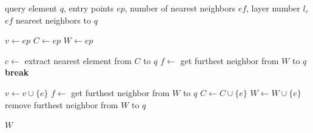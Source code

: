 \begin{algorithm}[H]
    \caption{SEARCH-LAYER \cite{Malkov-Yashunin-2016}}
    \label{alg:hnsw-2}
    \begin{algorithmic}[1]
        \Require query element $q$, entry points $ep$, number of nearest neighbors $ef$, layer number $l_c$
        \Ensure $ef$ nearest neighbors to $q$
        
        \State $v \gets ep$ 
        \State $C \gets ep$ 
        \State $W \gets ep$ 
        
            \State $c \gets$ extract nearest element from $C$ to $q$
            \State $f \gets$ get furthest neighbor from $W$ to $q$
                \State \textbf{break} 
            \EndIf
            
             
                    \State $v \gets v \cup \{e\}$
                    \State $f \gets$ get furthest neighbor from $W$ to $q$
                        \State $C \gets C \cup \{e\}$
                        \State $W \gets W \cup \{e\}$
                            \State remove furthest neighbor from $W$ to $q$
                        \EndIf
                    \EndIf
                \EndIf
            \EndFor
        \EndWhile
        
        \State \Return $W$
    \end{algorithmic}
\end{algorithm}